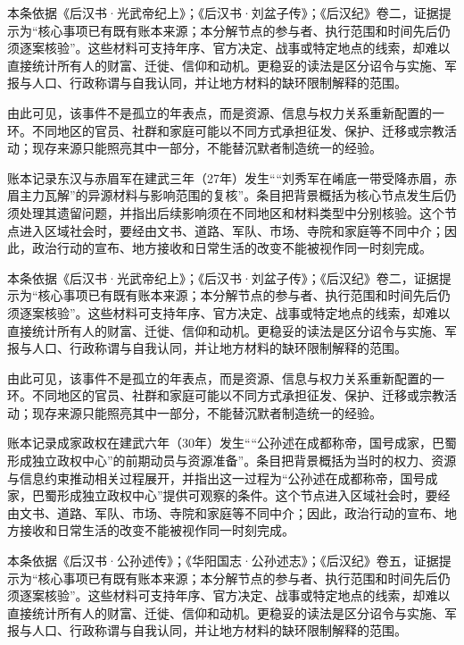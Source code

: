 本条依据《后汉书·光武帝纪上》；《后汉书·刘盆子传》；《后汉纪》卷二，证据提示为“核心事项已有既有账本来源；本分解节点的参与者、执行范围和时间先后仍须逐案核验”。这些材料可支持年序、官方决定、战事或特定地点的线索，却难以直接统计所有人的财富、迁徙、信仰和动机。更稳妥的读法是区分诏令与实施、军报与人口、行政称谓与自我认同，并让地方材料的缺环限制解释的范围。

由此可见，该事件不是孤立的年表点，而是资源、信息与权力关系重新配置的一环。不同地区的官员、社群和家庭可能以不同方式承担征发、保护、迁移或宗教活动；现存来源只能照亮其中一部分，不能替沉默者制造统一的经验。

账本记录东汉与赤眉军在建武三年（27年）发生““刘秀军在崤底一带受降赤眉，赤眉主力瓦解”的异源材料与影响范围的复核”。条目把背景概括为核心节点发生后仍须处理其遗留问题，并指出后续影响须在不同地区和材料类型中分别核验。这个节点进入区域社会时，要经由文书、道路、军队、市场、寺院和家庭等不同中介；因此，政治行动的宣布、地方接收和日常生活的改变不能被视作同一时刻完成。

本条依据《后汉书·光武帝纪上》；《后汉书·刘盆子传》；《后汉纪》卷二，证据提示为“核心事项已有既有账本来源；本分解节点的参与者、执行范围和时间先后仍须逐案核验”。这些材料可支持年序、官方决定、战事或特定地点的线索，却难以直接统计所有人的财富、迁徙、信仰和动机。更稳妥的读法是区分诏令与实施、军报与人口、行政称谓与自我认同，并让地方材料的缺环限制解释的范围。

由此可见，该事件不是孤立的年表点，而是资源、信息与权力关系重新配置的一环。不同地区的官员、社群和家庭可能以不同方式承担征发、保护、迁移或宗教活动；现存来源只能照亮其中一部分，不能替沉默者制造统一的经验。

账本记录成家政权在建武六年（30年）发生““公孙述在成都称帝，国号成家，巴蜀形成独立政权中心”的前期动员与资源准备”。条目把背景概括为当时的权力、资源与信息约束推动相关过程展开，并指出这一过程为“公孙述在成都称帝，国号成家，巴蜀形成独立政权中心”提供可观察的条件。这个节点进入区域社会时，要经由文书、道路、军队、市场、寺院和家庭等不同中介；因此，政治行动的宣布、地方接收和日常生活的改变不能被视作同一时刻完成。

本条依据《后汉书·公孙述传》；《华阳国志·公孙述志》；《后汉纪》卷五，证据提示为“核心事项已有既有账本来源；本分解节点的参与者、执行范围和时间先后仍须逐案核验”。这些材料可支持年序、官方决定、战事或特定地点的线索，却难以直接统计所有人的财富、迁徙、信仰和动机。更稳妥的读法是区分诏令与实施、军报与人口、行政称谓与自我认同，并让地方材料的缺环限制解释的范围。

